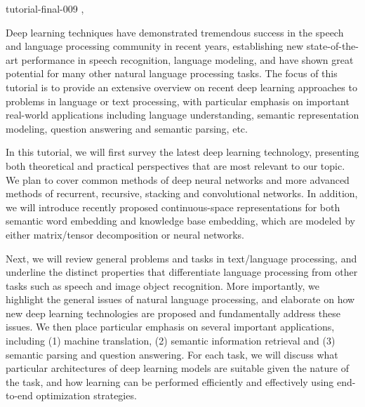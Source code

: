 \begin{tutorial}
  {tutorial-final-009}
  {\daydateyear, \tutorialafternoontime}
  {\TutLocE}

Deep learning techniques have demonstrated tremendous success in the
speech and language processing community in recent years, establishing
new state-of-the-art performance in speech recognition, language
modeling, and have shown great potential for many other natural
language processing tasks. The focus of this tutorial is to provide an
extensive overview on recent deep learning approaches to problems in
language or text processing, with particular emphasis on important
real-world applications including language understanding, semantic
representation modeling, question answering and semantic parsing, etc.

In this tutorial, we will first survey the latest deep learning
technology, presenting both theoretical and practical perspectives
that are most relevant to our topic. We plan to cover common methods
of deep neural networks and more advanced methods of recurrent,
recursive, stacking and convolutional networks. In addition, we will
introduce recently proposed continuous-space representations for both
semantic word embedding and knowledge base embedding, which are
modeled by either matrix/tensor decomposition or neural networks.

Next, we will review general problems and tasks in text/language
processing, and underline the distinct properties that differentiate
language processing from other tasks such as speech and image object
recognition. More importantly, we highlight the general issues of
natural language processing, and elaborate on how new deep learning
technologies are proposed and fundamentally address these issues. We
then place particular emphasis on several important applications,
including (1) machine translation, (2) semantic information retrieval
and (3) semantic parsing and question answering. For each task, we
will discuss what particular architectures of deep learning models are
suitable given the nature of the task, and how learning can be
performed efficiently and effectively using end-to-end optimization
strategies.

\end{tutorial}
